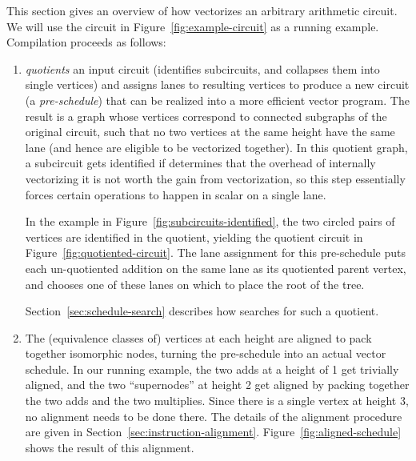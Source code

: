 This section gives an overview of how \system vectorizes an arbitrary arithmetic circuit.
We will use the circuit in Figure~\ref{fig:example-circuit} as a running example.
Compilation proceeds as follows:
\begin{enumerate}
    \item \system \textit{quotients} an input circuit (identifies subcircuits, and collapses them into single vertices) and assigns lanes to resulting vertices to produce a new circuit (a {\em pre-schedule}) that can be realized into a more efficient vector program. The result is a graph whose vertices correspond to connected subgraphs of the original circuit, such that no two vertices at the same height have the same lane (and hence are eligible to be vectorized together). In this quotient graph, a subcircuit gets identified if \system determines that the overhead of internally vectorizing it is not worth the gain from vectorization, so this step essentially forces certain operations to happen in scalar on a single lane. %
    
    In the example in Figure~\ref{fig:subcircuits-identified}, the two circled pairs of vertices are identified in the quotient, yielding the quotient circuit in Figure~\ref{fig:quotiented-circuit}.
    The lane assignment for this pre-schedule puts each un-quotiented addition on the same lane as its quotiented parent vertex, and chooses one of these lanes on which to place the root of the tree.

    Section~\ref{sec:schedule-search} describes how \system searches for such a quotient. 
    
    \item The (equivalence classes of) vertices at each height are aligned to pack together isomorphic nodes, turning the pre-schedule into an actual vector schedule. 
    In our running example, the two adds at a height of 1 get trivially aligned, and the two ``supernodes'' at height 2 get aligned by packing together the two adds and the two multiplies.
    Since there is a single vertex at height 3, no alignment needs to be done there. 
    The details of the alignment procedure are given in Section~\ref{sec:instruction-alignment}.
    Figure~\ref{fig:aligned-schedule} shows the result of this alignment.
    

\end{enumerate}
